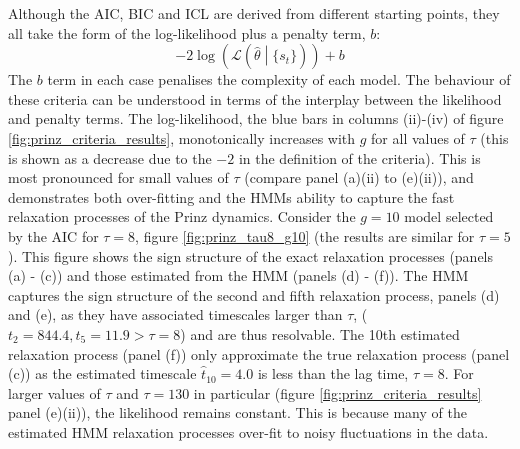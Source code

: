 Although the AIC, BIC and ICL are derived from different starting points, they all take the form of the log-likelihood plus a penalty term, $b$:
\begin{equation}
    -2\log{\left(\mathcal{L}\left(\hat{\theta} \middle|\{s_t\}\right)\right)} + b
\end{equation}
The $b$ term in each case penalises the complexity of each model. The behaviour of these criteria can be understood in terms of the interplay between the likelihood and penalty terms. The log-likelihood, the blue bars in columns (ii)-(iv) of figure \ref{fig:prinz_criteria_results}, monotonically increases with $g$ for all values of $\tau$ (this is shown as a decrease due to the $-2$ in the definition of the criteria). This is most pronounced for small values of $\tau$ (compare panel (a)(ii) to (e)(ii)), and demonstrates both over-fitting and the HMMs ability to capture the fast relaxation processes of the Prinz dynamics. Consider the $g=10$ model selected by the AIC for $\tau=8$, figure \ref{fig:prinz_tau8_g10} (the results are similar for $\tau=5$). This figure shows the sign structure of the exact relaxation processes (panels (a) - (c)) and those estimated from the HMM (panels (d) - (f)). The HMM captures the sign structure of the second and fifth relaxation process,  panels (d) and (e), as they have associated timescales larger than $\tau$, ($t_{2}=844.4, t_{5} = 11.9 > \tau=8$) and are thus resolvable. The 10th estimated relaxation process (panel (f)) only approximate the true relaxation process (panel (c)) as the estimated timescale $\hat{t}_{10} = 4.0$ is less than the lag time, $\tau=8$. For larger values of $\tau$ and $\tau= 130$ in particular (figure \ref{fig:prinz_criteria_results} panel (e)(ii)), the likelihood remains constant. This is because many of the estimated HMM relaxation processes over-fit to noisy fluctuations in the data. 

